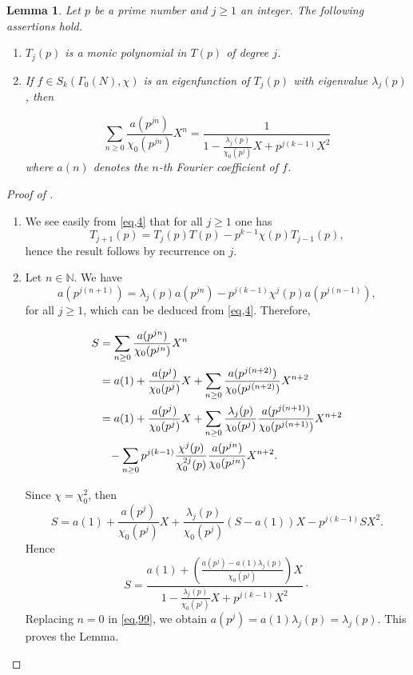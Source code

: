 \documentclass[smallcondensed]{svjour3}
\newtheorem{lem}{Lemma}
\begin{document}
\begin{lem}
Let $p$ be a prime number and $j\ge1$ an integer. The following assertions hold.

\begin{enumerate}
\item $T_j(p)$ is a monic polynomial in $T(p)$ of degree $j$.
\item If $f\in S_k(\Gamma_{0}(N),\chi)$ is an eigenfunction of $T_j(p)$ with eigenvalue $\lambda_j(p)$, then

\begin{equation}
\sum_{n\ge0}\frac{a(p^{jn})}{\chi_{0}(p^{jn})}X^n=\dfrac{1}{1-\frac{\lambda_j(p)}{\chi_{0}(p^{j})}X+p^{j(k-1)}X^2}\label{eq.1}
\end{equation}
 where $a(n)$ denotes the $n$-th Fourier coefficient of $f$.
\end{enumerate}
\end{lem}

\begin{proof}[Proof of ]
\begin{enumerate}
\item  We see easily from \eqref{eq,4} that for all $j\ge 1$ one has
$$
T_{j+1}(p)=T_j(p)T(p)-p^{k-1}\chi(p)T_{j-1}(p),
$$
hence the result follows by recurrence on $j$.
\item Let $n\in{\mathbb N}$. We have
\begin{equation}
a(p^{j(n+1)})=\lambda_j(p)a(p^{jn})-p^{j(k-1)}\chi^j(p)a(p^{j(n-1)}),\label{eq,99}
\end{equation}
for all $j\ge1$, which can be deduced from \eqref{eq,4}. Therefore,

\begin{align*}
S&=\sum_{n\geq 0}\frac{a(p^{jn})}{\chi_{0}(p^{jn})}X^{n}\\
&=a(1)+\frac{a(p^{j})}{\chi_{0}(p^{j})}X+\sum_{n\geq 0}\frac{a(p^{j(n+2)})}{\chi_{0}(p^{j(n+2)})}X^{n+2}\\ 
&=a(1)+\frac{a(p^{j})}{\chi_{0}(p^{j})}X+\sum_{n\geq 0}
\frac{\lambda_{j}(p)}{\chi_{0}(p^{j})}\frac{a(p^{j(n+1)})}{\chi_{0}(p^{j(n+1)})}X^{n+2}\\
&\hspace{0.3 cm }-\sum_{n\geq 0}p^{j(k-1)}\frac{\chi^{j}(p)}{\chi_{0}^{2j}(p)}\frac{a(p^{jn})}{\chi_{0}(p^{jn})}X^{n+2}.
\end{align*}

Since $\chi=\chi_{0}^{2}$, then
$$
S=a(1)+\frac{a(p^{j})}{\chi_{0}(p^{j})}X+\frac{\lambda _{j}(p)}{\chi_{0}(p^{j})}(S-a(1))X-p^{j(k-1)}S X^{2}.
$$
Hence
$$
S=\dfrac{a(1)+\left(\frac{a(p^j)-a(1)\lambda_{j}(p)}{\chi_{0}(p^j)}\right)X}{1-\frac{\lambda_j(p)}{\chi_{0}(p^{j})}X+p^{j(k-1)}X^2}\cdot
$$
Replacing $n=0$ in \eqref{eq,99}, we obtain $a(p^j)=a(1)\lambda_{j}(p)=\lambda_{j}(p)$. This proves the Lemma.
\end{enumerate}
\end{proof}
\end{document}
